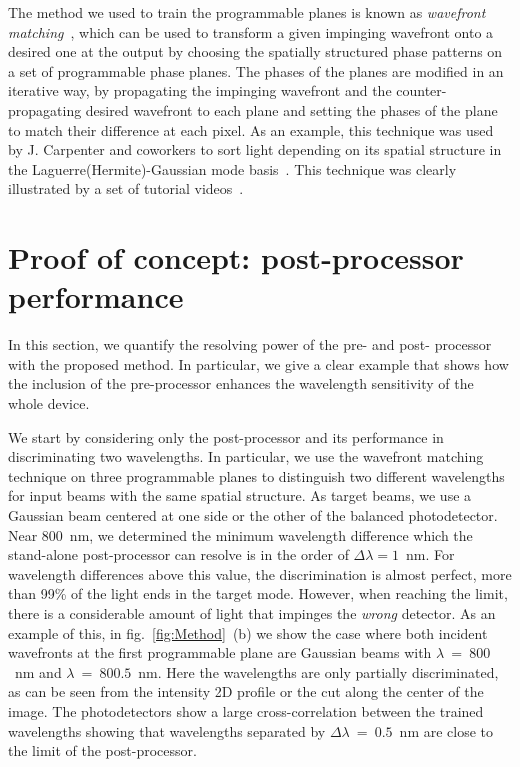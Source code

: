 \documentclass{optica-article}
\begin{document}
The method we used to train the programmable planes is known as \textit{wavefront matching}~\cite{sakamaki2007new}, which can be used to transform a given impinging wavefront onto a desired one at the output by choosing the spatially structured phase patterns on a set of programmable phase planes. The phases of the planes are modified in an iterative way, by propagating the impinging wavefront and the counter-propagating desired wavefront to each plane and setting the phases of the plane to match their difference at each pixel. As an example, this technique was used by J. Carpenter and coworkers to sort light depending on its spatial structure in the Laguerre(Hermite)-Gaussian mode basis~\cite{fontaine2019laguerre}. This technique was clearly illustrated by a set of tutorial videos~\cite{WFM_youtube}.



\section{Proof of concept: post-processor performance}

In this section, we quantify the resolving power of the pre- and post- processor with the proposed method. In particular, we give a clear example that shows how the inclusion of the pre-processor enhances the wavelength sensitivity of the whole device.

We start by considering only the post-processor and its performance in discriminating two wavelengths. In particular, we use the wavefront matching technique on three programmable planes to distinguish two different wavelengths for input beams with the same spatial structure. As target beams, we use a Gaussian beam centered at one side or the other of the balanced photodetector. 
Near 800~nm, we determined the minimum wavelength difference which the stand-alone post-processor can resolve is in the order of $\Delta\lambda=1$~nm. 
For wavelength differences above this value, the discrimination is almost perfect, more than 99\% of the light ends in the target mode. However, when reaching the limit, there is a considerable amount of light that impinges the \textit{wrong} detector. As an example of this, in  fig.~\ref{fig:Method}~(b) we show the case where both incident wavefronts at the first programmable plane are Gaussian beams with $\lambda$~=~$800$~nm and $\lambda$~=~$800.5$~nm. Here the wavelengths are only partially discriminated, as can be seen from the intensity 2D profile or the cut along the center of the image. The photodetectors show a large cross-correlation between the trained wavelengths showing that wavelengths separated by $\Delta \lambda$~=~$0.5$~nm are close to the limit of the post-processor.
\end{document}

